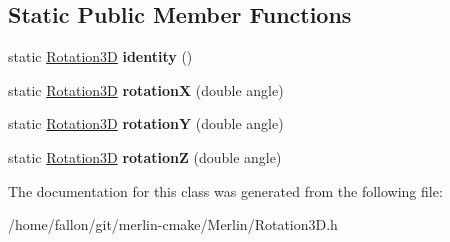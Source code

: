 \subsection*{Static Public Member Functions}
\begin{DoxyCompactItemize}
\item 
\mbox{\label{classRotation3D_a66e919375b8d247397c831e2480e66af}} 
static \hyperlink{classRotation3D}{Rotation3D} {\bfseries identity} ()
\item 
\mbox{\label{classRotation3D_ab14dd274b5bd1217dbb639ddfa971774}} 
static \hyperlink{classRotation3D}{Rotation3D} {\bfseries rotationX} (double angle)
\item 
\mbox{\label{classRotation3D_ad1e194fb1463363d295152ebdaaae082}} 
static \hyperlink{classRotation3D}{Rotation3D} {\bfseries rotationY} (double angle)
\item 
\mbox{\label{classRotation3D_a2dc1e02b6b0d0c9a80327a2c30f44a11}} 
static \hyperlink{classRotation3D}{Rotation3D} {\bfseries rotationZ} (double angle)
\end{DoxyCompactItemize}


The documentation for this class was generated from the following file\+:\begin{DoxyCompactItemize}
\item 
/home/fallon/git/merlin-\/cmake/\+Merlin/Rotation3\+D.\+h\end{DoxyCompactItemize}
